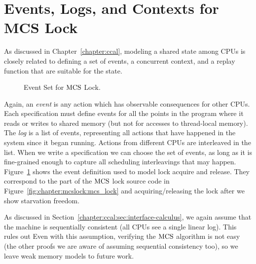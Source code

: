 \section{Events, Logs, and  Contexts for MCS Lock}
\label{chapter:mcslock:sec:eventlogandoracle}

As discussed in Chapter~\ref{chapter:ccal}, 
modeling a shared state among CPUs is 
closely related to defining a set of events, a concurrent context, and a replay function that are suitable for
the state.
\begin{figure}
\begin{minipage}{\linewidth}

\end{minipage}
\caption{Event Set for $\mathrm{MCS}$ Lock.}
\label{fig:chapter:mcslock:lock_event_type}
\end{figure}
Again, an \emph{event} is any action which has observable consequences for
other CPUs. Each specification must define events for all the points
in the program where it reads or writes to shared memory (but not for
accesses to thread-local memory). The \emph{log} is a list of
events, representing all actions that have happened in the system
since it began running. Actions from different CPUs are interleaved in
the list.
When we write a specification we can choose the set of events, as long
as it is fine-grained enough to capture all scheduling interleavings
that may happen.
Figure~\ref{fig:chapter:mcslock:lock_event_type} shows the event definition used to
model lock acquire and release. They correspond to the part of the $\mathrm{MCS}$ lock source code in Figure~\ref{fig:chapter:mcslock:mcs_lock}
and acquiring/releasing the lock after we show starvation freedom. 


As discussed in Section~\ref{chapter:ccal:sec:interface-calculus},  we again assume that the
machine is sequentially consistent (all CPUs see a single linear log). 
This rules out 
Even with this assumption,
verifying the $\mathrm{MCS}$ algorithm is not easy (the other proofs we are aware
of assuming sequential consistency too), so we leave weak memory models
to future work.


